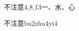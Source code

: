 \begin{entry}{不注意}{4,8,13}{⼀、⽔、⼼}
  \begin{phonetics}{不注意}{bu2zhu4yi4}
  \end{phonetics}
\end{entry}
